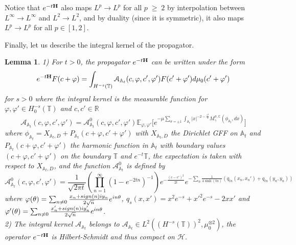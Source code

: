 \documentclass[11pt]{amsart}
\numberwithin{equation}{section}
\newtheorem{lemma}[theorem]{Lemma}
\theoremstyle{definition}
\renewcommand{\geq}{\;\geqslant\;}                   %
\newcommand{\C}{\mathbb{C}}
\newcommand{\A}{\mathbb{A}}
\newcommand{\R}{\mathbb{R}}
\def\E{\mathbb{E}}
\newcommand{\mc}{\mathcal}
\def\T{\mathbb{T}}
\begin{document}
Notice that $e^{-t{\bf H}}$ also maps $L^p\to L^p$ for all $p\geq 2$ by interpolation between $L^\infty\to L^\infty$ and $L^2\to L^2$, and by duality (since it is symmetric), it also maps $L^p\to L^p$ for all $p\in [1,2]$.

Finally, let us describe the integral kernel of the propagator.
\begin{lemma}\label{Int_kernel_prop}
1) For $t>0$, the propagator $e^{-t{\bf H}}$ can be written under the form 
\begin{equation}\label{prop_kernel} 
e^{-t{\bf H}}F(c+\varphi)=\int_{H^{-s}(\T)}\mc{A}_{\A_t}(c,\varphi,c',\varphi')F(c'+\varphi')d\mu_{0}(c'+\varphi')
\end{equation}
for $s>0$ where the integral kernel is the measurable function for $\varphi,\varphi'\in H^{-s}_0(\T)$ and $c,c'\in \R$
\[\mc{A}_{\A_t}(c,\varphi,c',\varphi')=\mc{A}^0_{\A_t}(c,\varphi,c',\varphi')\E_{\varphi,\varphi'}\Big[e^{-\mu \sum_{\sigma=\pm 1}\int_{\A_t}|x|^{-2-\frac{\gamma^2}{2}}M_{\gamma}^{\sigma,\C}(\phi_{\A_t},dx)}\Big]\]
where $\phi_{\A_t}=X_{\A_t,D}+P_{\A_t}(c+\varphi,c'+\varphi')$ with $X_{\A_t,D}$ the Dirichlet GFF on $\A_t$ and $P_{\A_t}(c+\varphi,c'+\varphi')$ the harmonic function in $\A_t$ with boundary values $(c+\varphi,c'+\varphi')$ on the boundary $\T$ and $e^{-t}\T$, the expectation is taken with respect to $X_{\A_t,D}$,  and the function $\mc{A}^0_{\A_t}$ is defined by 
\begin{equation}\label{free_prop_formula} 
\mc{A}^0_{\A_t}(c,\varphi,c',\varphi')=\frac{1}{\sqrt{2\pi t}}(\prod_{n=1}^\infty(1-e^{-2tn})^{-1})e^{-\frac{(c-c')^2}{2t}} e^{-\sum_n
\frac{1}{4\sinh(tn)}(q_{tn}(x_n,x_n')+q_{tn}(y_n,y_n))}
\end{equation}
where $\varphi(\theta)=\sum_{n\not=0} \frac{x_n+{\rm sign}(n)iy_n}{2\sqrt{n}}e^{in\theta}$, $q_s(x,x')=x^2e^{-s}+{x'}^2e^{-s}-2xx'$ and 
$\varphi'(\theta)=\sum_{n\not=0} \frac{x_n'+{\rm sign}(n)iy_n'}{2\sqrt{n}}e^{in\theta}$.\\
2) The integral kernel $\mc{A}_{\A_t}$ belongs to $\mc{A}_{\A_t}\in L^2((H^{-s}(\T))^2,\mu_0^{\otimes 2})$, the operator $e^{-t{\bf H}}$ is Hilbert-Schmidt and thus compact on $\mc{H}$.
\end{lemma}
\end{document}
